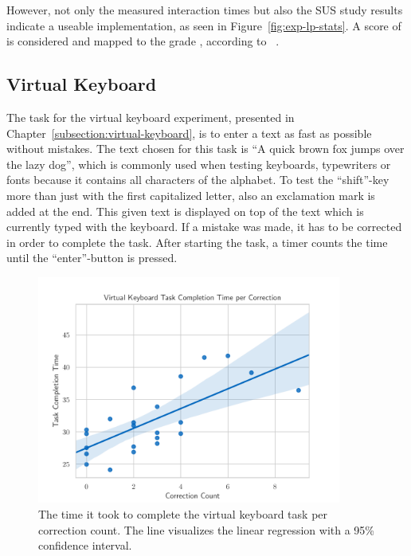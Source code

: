 However, not only the measured interaction times but also the \ac{SUS} study results indicate a useable implementation, as seen in Figure~\ref{fig:exp-lp-stats}. A score of \evalExpLpSusScore{} is considered \evalExpLpSusAdj{} and mapped to the grade \evalExpLpSusGrade{}, according to \citeauthor{Bangor.2009}~\cite[120\psq]{Bangor.2009}.



\subsection{Virtual Keyboard}\label{section:eval-res-vk}

The task for the virtual keyboard experiment, presented in Chapter~\ref{subsection:virtual-keyboard}, is to enter a text as fast as possible without mistakes. The text chosen for this task is \enquote{A quick brown fox jumps over the lazy dog}, which is commonly used when testing keyboards, typewriters or fonts because it contains all characters of the alphabet. To test the \enquote{shift}-key more than just with the first capitalized letter, also an exclamation mark is added at the end. This given text is displayed on top of the text which is currently typed with the keyboard. If a mistake was made, it has to be corrected in order to complete the task. After starting the task, a timer counts the time until the \enquote{enter}-button is pressed.

\begin{figure}[H]
  \centering
  \includegraphics[width=10cm]{figures/evaluation/eval_exp_vk_ratio_scatter.pdf}
  \caption[Virtual keyboard experiment results]{The time it took to complete the virtual keyboard task per correction count. The line visualizes the linear regression with a 95\% confidence interval.}\label{fig:eval-exp-vk-ratio-scatter}
\end{figure}

